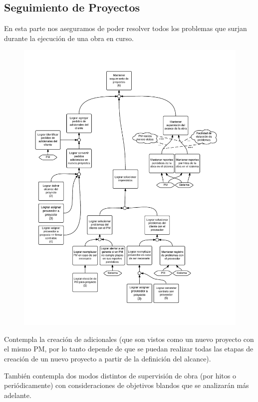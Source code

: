 \newpage
\subsection{Seguimiento de Proyectos}
En esta parte nos aseguramos de poder resolver todos los problemas que surjan durante la ejecución de una obra en curso.
\begin{figure}[H]
\includegraphics[width=\textwidth, clip=true, trim=15pt 50pt 15pt 60pt]{imagenes/objetivos/objetivos14.pdf}
\end{figure}

\newpage
Contempla la creación de adicionales (que son vistos como un nuevo proyecto con el mismo PM, por lo tanto depende de que se puedan realizar todas las etapas de creación de un nuevo proyecto a partir de la definición del alcance).

También contempla dos modos distintos de supervisión de obra (por hitos o periódicamente) con consideraciones de objetivos blandos que se analizarán más adelante.

